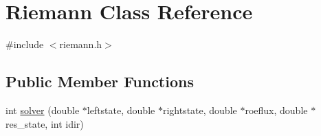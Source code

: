 \hypertarget{classRiemann}{}\section{Riemann Class Reference}
\label{classRiemann}


{\ttfamily \#include $<$riemann.\+h$>$}

\subsection*{Public Member Functions}
\begin{DoxyCompactItemize}
\item 
int \hyperlink{classRiemann_ac605a365149f83e6c27c3d5980d2e42f}{solver} (double $\ast$leftstate, double $\ast$rightstate, double $\ast$roeflux, double $\ast$res\+\_\+state, int idir)
\end{DoxyCompactItemize}
